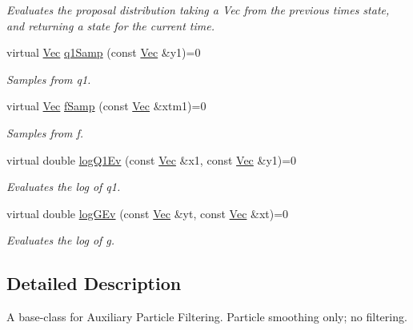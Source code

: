 \begin{DoxyCompactItemize}
\begin{DoxyCompactList}\small\item\em Evaluates the proposal distribution taking a Vec from the previous time\textquotesingle{}s state, and returning a state for the current time. \end{DoxyCompactList}\item 
virtual \hyperlink{apf__filter_8h_a4c7df05c6f5e8a0d15ae14bcdbc07152}{Vec} \hyperlink{classAPFSmoother_ae1b444849e0e2882c00e928409d8fc4b}{q1\+Samp} (const \hyperlink{apf__filter_8h_a4c7df05c6f5e8a0d15ae14bcdbc07152}{Vec} \&y1)=0
\begin{DoxyCompactList}\small\item\em Samples from q1. \end{DoxyCompactList}\item 
virtual \hyperlink{apf__filter_8h_a4c7df05c6f5e8a0d15ae14bcdbc07152}{Vec} \hyperlink{classAPFSmoother_a823b3f5d1d942f5305d05dfd318f4851}{f\+Samp} (const \hyperlink{apf__filter_8h_a4c7df05c6f5e8a0d15ae14bcdbc07152}{Vec} \&xtm1)=0
\begin{DoxyCompactList}\small\item\em Samples from f. \end{DoxyCompactList}\item 
virtual double \hyperlink{classAPFSmoother_a4353091a34dac9dd072f407a593aea03}{log\+Q1\+Ev} (const \hyperlink{apf__filter_8h_a4c7df05c6f5e8a0d15ae14bcdbc07152}{Vec} \&x1, const \hyperlink{apf__filter_8h_a4c7df05c6f5e8a0d15ae14bcdbc07152}{Vec} \&y1)=0
\begin{DoxyCompactList}\small\item\em Evaluates the log of q1. \end{DoxyCompactList}\item 
virtual double \hyperlink{classAPFSmoother_acd249cf906d89162f367ded9f02c7793}{log\+G\+Ev} (const \hyperlink{apf__filter_8h_a4c7df05c6f5e8a0d15ae14bcdbc07152}{Vec} \&yt, const \hyperlink{apf__filter_8h_a4c7df05c6f5e8a0d15ae14bcdbc07152}{Vec} \&xt)=0
\begin{DoxyCompactList}\small\item\em Evaluates the log of g. \end{DoxyCompactList}\end{DoxyCompactItemize}


\subsection{Detailed Description}
A base-\/class for Auxiliary Particle Filtering. Particle smoothing only; no filtering. 

